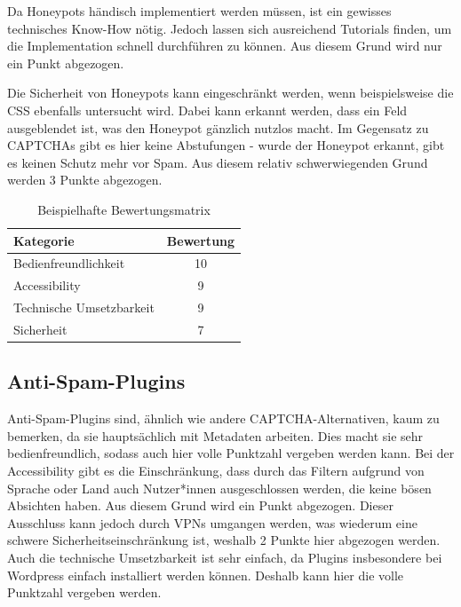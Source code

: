 Da Honeypots händisch implementiert werden müssen, ist ein gewisses technisches Know-How nötig.
Jedoch lassen sich ausreichend Tutorials finden, um die Implementation schnell durchführen zu können.
Aus diesem Grund wird nur ein Punkt abgezogen.

Die Sicherheit von Honeypots kann eingeschränkt werden, wenn beispielsweise die CSS ebenfalls untersucht wird. 
Dabei kann erkannt werden, dass ein Feld ausgeblendet ist, was den Honeypot gänzlich nutzlos macht.
Im Gegensatz zu CAPTCHAs gibt es hier keine Abstufungen - wurde der Honeypot erkannt, gibt es keinen Schutz mehr vor Spam.
Aus diesem relativ schwerwiegenden Grund werden 3 Punkte abgezogen.

\begin{table}[h!]
    \caption{Beispielhafte Bewertungsmatrix}
    \begin{center}
        \begin{tabular}{l|c}
            Kategorie                       & Bewertung \\\hline
            Bedienfreundlichkeit            & 10         \\
            Accessibility                   & 9        \\
            Technische Umsetzbarkeit        & 9         \\
            Sicherheit                      & 7         
        \end{tabular}
    \end{center}
\end{table}

\subsection{Anti-Spam-Plugins}
Anti-Spam-Plugins sind, ähnlich wie andere CAPTCHA-Alternativen, kaum zu bemerken, da sie hauptsächlich mit Metadaten arbeiten.
Dies macht sie sehr bedienfreundlich, sodass auch hier volle Punktzahl vergeben werden kann.
Bei der Accessibility gibt es die Einschränkung, dass durch das Filtern aufgrund von Sprache oder Land auch Nutzer*innen ausgeschlossen werden,
die keine bösen Absichten haben. Aus diesem Grund wird ein Punkt abgezogen.
Dieser Ausschluss kann jedoch durch VPNs umgangen werden,
was wiederum eine schwere Sicherheitseinschränkung ist, weshalb 2 Punkte hier abgezogen werden.
Auch die technische Umsetzbarkeit ist sehr einfach, da Plugins insbesondere bei Wordpress einfach installiert werden können.
Deshalb kann hier die volle Punktzahl vergeben werden.

